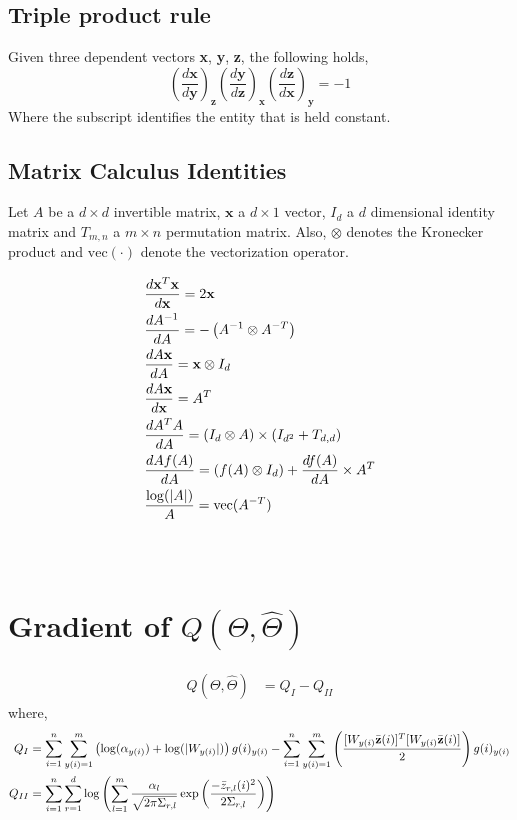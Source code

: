 \documentclass[]{article}
\begin{document}
\subsection{Triple product rule}
Given three dependent vectors \textbf{x}, \textbf{y}, \textbf{z}, the following holds,
\begin{equation}\label{triple_prod_rule}
\left( \frac{d\textbf{x}}{d\textbf{y}}\right)_\textbf{z} \left( \frac{d\textbf{y}}{d\textbf{z}}\right)_\textbf{x} \left( \frac{d\textbf{z}}{d\textbf{x}}\right)_\textbf{y} = -1
\end{equation}
Where the subscript identifies the entity that is held constant.

\subsection{Matrix Calculus Identities}
Let $A$ be a $d\times d$ invertible matrix, $\textbf{x}$ a $d\times 1$ vector, $I_d$ a $d$ dimensional identity matrix and $T_{m,n}$ a $m\times n$ permutation matrix. Also, $\otimes$ denotes the Kronecker product and $\text{vec}(\cdot )$ denote the vectorization operator.

\begin{align}
&\frac{d\textbf{x}^T\textbf{x}}{d\textbf{x}} = 2\textbf{x} \label{id:x'x_x} \\
&\frac{dA^{-1}}{dA} = -\left( A^{-1} \otimes A^{-T}\right) \label{id:invA_A} \\
&\frac{dA\textbf{x}}{dA} = \textbf{x}\otimes I_d \label{id:Ax_A} \\
&\frac{dA\textbf{x}}{d\textbf{x}} = A^T \label{id:Ax_x} \\
&\frac{dA^TA}{dA} = (I_d \otimes A)\times (I_{d^2}+T_{d,d}) \label{id:A'A_A} \\
&\frac{dA f(A)}{dA} = (f(A)\otimes I_d)+\frac{df(A)}{dA}\times A^T \label{Af(A),A} \\
&\frac{\log(|A|)}{A} = \textmd{vec}(A^{-T}) \label{id:log|A|_A}
\end{align}
\\ \\
\section{Gradient of $Q(\Theta,\hat{\Theta})$}\label{sec:derivation_of_gradient}

\begin{align}\label{eq:GEM_objective_QI_QII}
Q(\Theta,\hat{\Theta}) & = Q_I - Q_{II}
\end{align}
where,
\begin{align*}\label{eq:QI_and_Q2}
Q_I& = \sum\limits_{i=1}^n \sum\limits_{y(i)=1}^m  \left( \log (\alpha_{y(i)}) + \log(|W_{y(i)}|)\right) g(i)_{y(i)}  -\sum\limits_{i=1}^n \sum\limits_{y(i)=1}^m  \left(\frac{[W_{y(i)}\bar{\textbf{z}}({i})]^T [W_{y(i)}\bar{\textbf{z}}({i})]}{2}\right) g(i)_{y(i)}   \\
 Q_{II}& = \sum\limits_{i=1}^n \sum\limits_{r=1}^{d} \log \left(\sum\limits_{l=1}^{m} \frac{\alpha_l}{\sqrt{2\pi\Sigma_{r,l}}} \exp\left( \frac{-\bar{z}_{r,l}(i)^2}{2\Sigma_{r,l}}\right) \right)
\end{align*}
\end{document}
